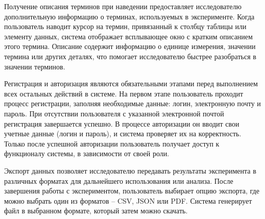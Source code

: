 Получение описания терминов при наведении предоставляет исследователю дополнительную информацию о терминах, используемых в эксперименте. Когда пользователь наводит курсор на термин, привязанный к столбцу таблицы или элементу данных, система отображает всплывающее окно с кратким описанием этого термина. Описание содержит информацию о единице измерения, значении термина или других деталях, что помогает исследователю быстрее разобраться в значении терминов.

Регистрация и авторизация являются обязательными этапами перед выполнением всех остальных действий в системе. На первом этапе пользователь проходит процесс регистрации, заполняя необходимые данные: логин, электронную почту и пароль. При отсутствии пользователя с указанной электронной почтой регистрация завершается успешно. В процессе авторизации он вводит свои учетные данные (логин и пароль), и система проверяет их на корректность. Только после успешной авторизации пользователь получает доступ к функционалу системы, в зависимости от своей роли.

Экспорт данных позволяет исследователю передавать результаты эксперимента в различных форматах для дальнейшего использования или анализа. После завершения работы с экспериментом, пользователь выбирает опцию экспорта, где можно выбрать один из форматов -- CSV, JSON или PDF. Система генерирует файл в выбранном формате, который затем можно скачать.

%

